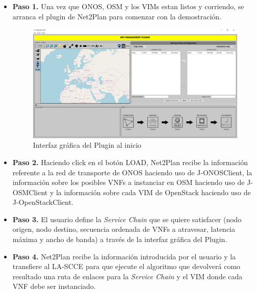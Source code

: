 \begin{itemize}
	
	\item \textbf{Paso 1.} Una vez que \ac{ONOS}, \ac{OSM} y los \acp{VIM} estan listos y corriendo, se arranca el plugin de Net2Plan para comenzar con la demostración.
	
	\begin{figure}[!ht]
		\centering
		\includegraphics[width=0.9\linewidth]{imagenes/nfvplugin_dashboard}
		\caption{Interfaz gráfica del Plugin al inicio}
		\label{fig:nfvproof_inicio}
	\end{figure}
	
	\item \textbf{Paso 2.} Haciendo click en el botón LOAD, Net2Plan recibe la información referente a la red de transporte de \ac{ONOS} haciendo uso de J-ONOSClient, la información sobre los posibles \acp{VNF} a instanciar en \ac{OSM} haciendo uso de J-OSMClient y la información sobre cada \ac{VIM} de OpenStack haciendo uso de J-OpenStackClient.
	
	\item \textbf{Paso 3.} El usuario define la \textit{Service Chain} que se quiere satisfacer (nodo origen, nodo destino, secuencia ordenada de VNFs a atravesar, latencia máxima y ancho de banda) a través de la interfaz gráfica del Plugin.
	
	\clearpage
	
	\item \textbf{Paso 4.} Net2Plan recibe la información introducida por el usuario y la transfiere al \ac{LA-SCCE} para que ejecute el algoritmo que devolverá como resultado una ruta de enlaces para la \textit{Service Chain} y el \ac{VIM} donde cada \ac{VNF} debe ser instanciado.
	

\end{itemize}
